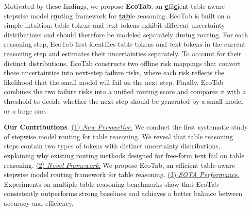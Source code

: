 \documentclass[11pt]{article}
\begin{document}
Motivated by these findings, we propose \textbf{EcoTab}, an \textbf{\underline{e}}ffi\textbf{\underline{c}}ient table-aware stepwise model r\textbf{\underline{o}}uting framework for \textbf{\underline{tab}}le reasoning. EcoTab is built on a simple intuition: table tokens and text tokens exhibit different uncertainty distributions and should therefore be modeled separately during routing. For each reasoning step, EcoTab first identifies table tokens and text tokens in the current reasoning step and estimates their uncertainties separately. To account for their distinct distributions, EcoTab constructs two offline risk mappings that convert these uncertainties into next-step failure risks, where each risk reflects the likelihood that the small model will fail on the next step. Finally, EcoTab combines the two failure risks into a unified routing score and compares it with a threshold to decide whether the next step should be generated by a small model or a large one.



\textbf{Our Contributions}. 
\underline{(1) \textit{New Perspective}.} We conduct the first systematic study of stepwise model routing for table reasoning. We reveal that table reasoning steps contain two types of tokens with distinct uncertainty distributions, explaining why existing routing methods designed for free-form text fail on table reasoning. \underline{(2) \textit{Novel Framework}.} We propose EcoTab, an efficient table-aware stepwise model routing framework for table reasoning. \underline{(3) \textit{SOTA Performance}.} Experiments on multiple table reasoning benchmarks show that EcoTab consistently outperforms strong baselines and achieves a better balance between accuracy and efficiency.

\vspace{-2pt}
\end{document}
